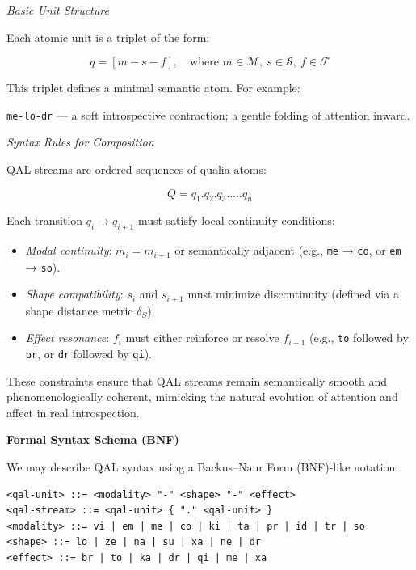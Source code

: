 \documentclass[11pt]{article}
\numberwithin{equation}{section} %
\begin{document}
\bigskip

\textit{Basic Unit Structure}

Each atomic unit is a triplet of the form:

\begin{equation}
q = [m\!-\!s\!-\!f], \quad \text{where } m \in \mathcal{M},\ s \in \mathcal{S},\ f \in \mathcal{F}
\end{equation}

This triplet defines a minimal semantic atom. For example:

\begin{center}
\texttt{me-lo-dr} — a soft introspective contraction; a gentle folding of attention inward.
\end{center}

\bigskip

\textit{Syntax Rules for Composition}

QAL streams are ordered sequences of qualia atoms:

\begin{equation}
Q = q_1 . q_2 . q_3 . \dots . q_n
\end{equation}

Each transition \( q_i \rightarrow q_{i+1} \) must satisfy local continuity conditions:
\begin{itemize}
  \item \textit{Modal continuity}: \( m_i = m_{i+1} \) or semantically adjacent (e.g., \texttt{me} → \texttt{co}, or \texttt{em} → \texttt{so}).
  \item \textit{Shape compatibility}: \( s_i \) and \( s_{i+1} \) must minimize discontinuity (defined via a shape distance metric \( \delta_S \)).
  \item \textit{Effect resonance}: \( f_i \) must either reinforce or resolve \( f_{i-1} \) (e.g., \texttt{to} followed by \texttt{br}, or \texttt{dr} followed by \texttt{qi}).
\end{itemize}

These constraints ensure that QAL streams remain semantically smooth and phenomenologically coherent, mimicking the natural evolution of attention and affect in real introspection.

\bigskip

\noindent\textbf{Formal Syntax Schema (BNF)}

We may describe QAL syntax using a Backus–Naur Form (BNF)-like notation:

\begin{verbatim}
<qal-unit> ::= <modality> "-" <shape> "-" <effect>
<qal-stream> ::= <qal-unit> { "." <qal-unit> }
<modality> ::= vi | em | me | co | ki | ta | pr | id | tr | so
<shape> ::= lo | ze | na | su | xa | ne | dr
<effect> ::= br | to | ka | dr | qi | me | xa
\end{verbatim}
\end{document}
